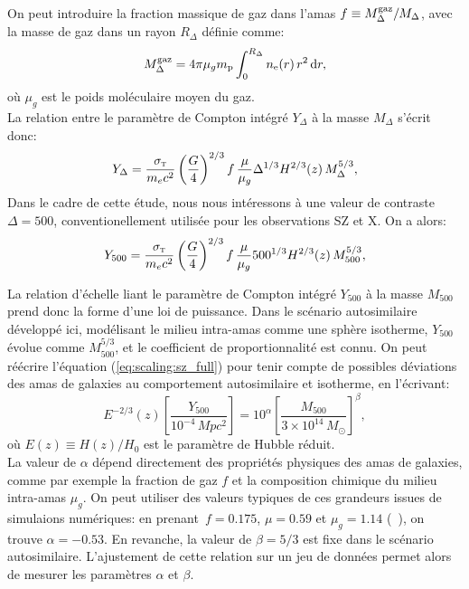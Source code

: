 On peut introduire la fraction massique de gaz dans l'amas $f \equiv M_\Delta^{\rm gaz} / M_\Delta$, avec la masse de gaz dans un rayon $R_\Delta$ définie comme:
\begin{equation}
    M_\Delta^{\rm gaz} = 4\pi \mu_g m_{\rm p} \int_0^{R_\Delta} n_{\rm e}(r) \, r^2 \, \mathrm{d} r,
\end{equation}
où $\mu_g$ est le poids moléculaire moyen du gaz. \\
La relation entre le paramètre de Compton intégré $Y_\Delta$ à la masse $M_\Delta$ s'écrit donc:
\begin{equation}
    Y_\Delta = \frac{\sigma_\textsc{t}}{m_e c^2} \left(\frac{G}{4}\right)^{2/3} f\, \frac{\mu}{\mu_g} \Delta^{1/3} H^{2/3}(z) \, M_\Delta^{5/3},
\end{equation}
Dans le cadre de cette étude, nous nous intéressons à une valeur de contraste $\Delta=500$, conventionellement utilisée pour les observations SZ et X.
On a alors:
\begin{equation}
    \label{eq:scaling:sz_full}
    Y_{500} = \frac{\sigma_\textsc{t}}{m_e c^2} \left(\frac{G}{4}\right)^{2/3} f\, \frac{\mu}{\mu_g} 500^{1/3} H^{2/3}(z) \, M_{500}^{5/3},
\end{equation}

La relation d'échelle liant le paramètre de Compton intégré $Y_{500}$ à la masse $M_{500}$ prend donc la forme d'une loi de puissance.
Dans le scénario autosimilaire développé ici, modélisant le milieu intra-amas comme une sphère isotherme, $Y_{500}$ évolue comme $M_{500}^{5/3}$, et le coefficient de proportionnalité est connu.
On peut réécrire l'équation (\ref{eq:scaling:sz_full}) pour tenir compte de possibles déviations des amas de galaxies au comportement autosimilaire et isotherme, en l'écrivant:
\begin{equation}
    \label{eq:sz_scaling}
    E^{-2/3}(z) \left[\frac{Y_{500}}{10^{-4} \,\unit{Mpc^2}}\right] = 10^\alpha \left[\frac{M_{500}}{3 \times 10^{14} \,M_\odot}\right]^\beta,
\end{equation}
où $E(z) \equiv H(z)/H_0$ est le paramètre de Hubble réduit. \\
La valeur de $\alpha$ dépend directement des propriétés physiques des amas de galaxies, comme par exemple la fraction de gaz $f$ et la composition chimique du milieu intra-amas $\mu_g$.
On peut utiliser des valeurs typiques de ces grandeurs issues de simulaions numériques: en prenant $\,f = 0.175$, $\mu = 0.59$ et $\mu_g = 1.14$ (\eg\ \cite{arnaud_universal_2010}), on trouve $\alpha = -0.53$.
En revanche, la valeur de $\beta = 5/3$ est fixe dans le scénario autosimilaire.
L'ajustement de cette relation sur un jeu de données permet alors de mesurer les paramètres $\alpha$ et $\beta$.

